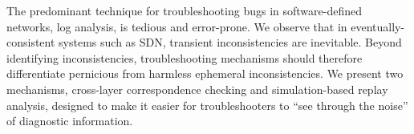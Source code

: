 The predominant technique for troubleshooting bugs in software-defined networks,
log analysis, is tedious and error-prone. We observe that
in eventually-consistent systems such as SDN,
transient inconsistencies are inevitable. Beyond identifying inconsistencies,
troubleshooting mechanisms should therefore differentiate
pernicious from harmless ephemeral inconsistencies. We present two
mechanisms, cross-layer correspondence checking and simulation-based replay analysis, 
designed to make it easier for troubleshooters to ``see through the noise'' of
diagnostic information.

